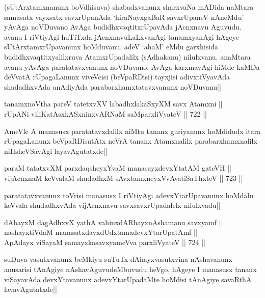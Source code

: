 \begin{artha} 
(sUtArxtamxnanunx boVdhisuva) shabadxvanunx sharxvaNa mADida naMtara 
samasatx vayxsatx savxrUpanAda `hiraNayxgaBaR savxrUpaneV nAneMdu' 
yAvAga noVDuvano AvAga budidhxvaqtitxrUpavAda jAcnxnavu Aguvudu. avanu 
I riVtiyAgi huTiTxda jAcnxnavuLaLxvanAgi tanamxyanAgi hAgeye 
sUtArxtamxrUpavanunx hoMduvanu. adeV `ahaM' eMdu garxhisida 
budidhxvaqtitxyalilxruva AtamxrUpadalilx (sAdhakanu) nilulxvanu. 
anaMtara avanu yAvAga paratatavxvanunx noVDuvano, AvAga karxmavAgi 
hiMde kaMDa deVvatA rUpagaLanunx viveVcisi (beVpaRDisi) tayxjisi 
adivxtiVyavAda shudadhxvAda anAdiyAda parabarxhamxtatavxvanunx 
noVDuvanu||
\end{artha}

\begin{shl}
tanamxnoV\s tha pareV tatetxvXV labadhxlakaSxyXM savx Atamxni || \\
rUpANi viliKatAsxkASxninxvARNaM saMparxliVyateV ||  722 ||  
\end{shl}

\begin{artha} 
AmeVle A manasusx paratatavxdalilx niMtu tananx guriyanunx hoMdidudx 
itara rUpagaLanunx beVpaRDisutAtx neVrA tananx Atamxnalilx 
parabarxhamxnalilx niHsheVSavAgi layavAgutatxde||
\end{artha}

\begin{shl}
paraM tatatxvXM parxdaqsheyxYvaM manasayxdevxYtatAM gateVH || \\
vijAcnxnaM keVvalaM shudadhxM sAvxtamxneyxVvAvatiSaThxteV ||  723 ||  
\end{shl}

\begin{artha} 
paratatavxvanunx toVrisi manasusx I riVtiyAgi adevxYtarUpavanunx 
hoMdalu keVvala shudadhxvAda vijAcnxnavu savxsavxrUpadalelx 
nilulxvadu||
\end{artha}

\begin{shl}
dAhayxM dagAdhxvX yathA vahinxdARhayxnAshamanu savxyamf || \\
nashayxtiVdaM manasatxdavxdUdxtamadevxYtarUpatAmf || \\
ApAdayx viSayaM samayxkasavxyameVva parxliVyateV ||  724 ||  
\end{shl}

\begin{artha} 
suDuva vasutxvanunx beMkiyu suTuTx dAhayxvasutxvina nAshavanunx 
anusarisi tAnAgiye nAshavAguvudeMbuvudu heVgo, hAgeye I manasusx 
tananx viSayavAda devxYtavanunx adevxYtarUpadaMte hoMdisi tAnAgiye 
savaRthA layavAgutatxde||
\end{artha}

